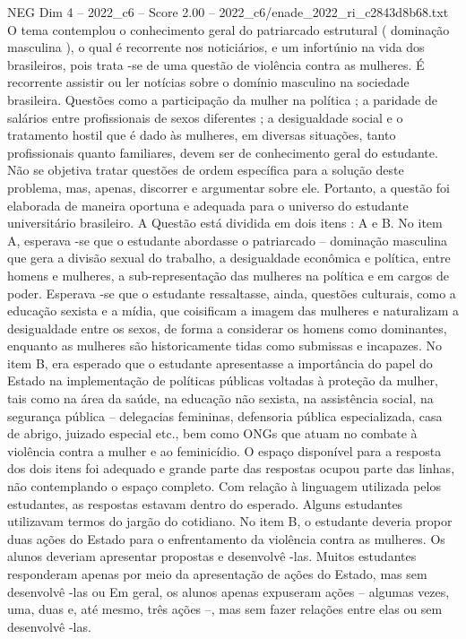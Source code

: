 \begin{textsample}{NEG Dim 4 – 2022\_c6 – Score 2.00 – 2022\_c6/enade\_2022\_ri\_c2843d8b68.txt}
O tema contemplou o conhecimento geral do patriarcado estrutural ( dominação masculina ), o qual é recorrente nos noticiários, e um infortúnio na vida dos brasileiros, pois trata -se de uma questão de violência contra as mulheres.
É recorrente assistir ou ler notícias sobre o domínio masculino na sociedade brasileira.
Questões como a participação da mulher na política ; a paridade de salários entre profissionais de sexos diferentes ; a desigualdade social e o tratamento hostil que é dado às mulheres, em diversas situações, tanto profissionais quanto familiares, devem ser de conhecimento geral do estudante.
Não se objetiva tratar questões de ordem específica para a solução deste problema, mas, apenas, discorrer e argumentar sobre ele.
Portanto, a questão foi elaborada de maneira oportuna e adequada para o universo do estudante universitário brasileiro.
A Questão está dividida em dois itens : A e B.
No item A, esperava -se que o estudante abordasse o patriarcado – dominação masculina que gera a divisão sexual do trabalho, a desigualdade econômica e política, entre homens e mulheres, a sub-representação das mulheres na política e em cargos de poder.
Esperava -se que o estudante ressaltasse, ainda, questões culturais, como a educação sexista e a mídia, que coisificam a imagem das mulheres e naturalizam a desigualdade entre os sexos, de forma a considerar os homens como dominantes, enquanto as mulheres são historicamente tidas como submissas e incapazes.
No item B, era esperado que o estudante apresentasse a importância do papel do Estado na implementação de políticas públicas voltadas à proteção da mulher, tais como na área da saúde, na educação não sexista, na assistência social, na segurança pública – delegacias femininas, defensoria pública especializada, casa de abrigo, juizado especial etc., bem como ONGs que atuam no combate à violência contra a mulher e ao feminicídio.
O espaço disponível para a resposta dos dois itens foi adequado e grande parte das respostas ocupou parte das linhas, não contemplando o espaço completo.
Com relação à linguagem utilizada pelos estudantes, as respostas estavam dentro do esperado.
Alguns estudantes utilizavam termos do jargão do cotidiano.
No item B, o estudante deveria propor duas ações do Estado para o enfrentamento da violência contra as mulheres.
Os alunos deveriam apresentar propostas e desenvolvê -las.
Muitos estudantes responderam apenas por meio da apresentação de ações do Estado, mas sem desenvolvê -las ou Em geral, os alunos apenas expuseram ações – algumas vezes, uma, duas e, até mesmo, três ações –, mas sem fazer relações entre elas ou sem desenvolvê -las.

\end{textsample}
